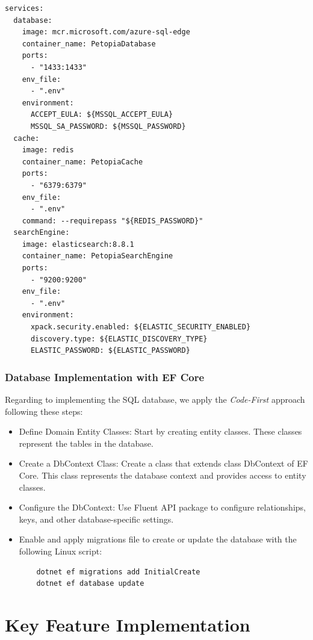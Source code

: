 \begin{lstlisting}[caption=Setup Development Environment with Docker, label={lst:docker-code}]
services:
  database:
    image: mcr.microsoft.com/azure-sql-edge
    container_name: PetopiaDatabase
    ports:
      - "1433:1433"
    env_file:
      - ".env"
    environment:
      ACCEPT_EULA: ${MSSQL_ACCEPT_EULA}
      MSSQL_SA_PASSWORD: ${MSSQL_PASSWORD}
  cache:
    image: redis
    container_name: PetopiaCache
    ports:
      - "6379:6379"
    env_file:
      - ".env"
    command: --requirepass "${REDIS_PASSWORD}"
  searchEngine:
    image: elasticsearch:8.8.1
    container_name: PetopiaSearchEngine
    ports:
      - "9200:9200"
    env_file:
      - ".env"
    environment:
      xpack.security.enabled: ${ELASTIC_SECURITY_ENABLED}
      discovery.type: ${ELASTIC_DISCOVERY_TYPE}
      ELASTIC_PASSWORD: ${ELASTIC_PASSWORD}
\end{lstlisting}

\subsubsection*{Database Implementation with EF Core}

Regarding to implementing the SQL database, we apply the \textit{Code-First} approach following these steps:
\begin{itemize}
    \item Define Domain Entity Classes:
          Start by creating entity classes. These classes represent the tables in the database.

    \item Create a DbContext Class:
          Create a class that extends class DbContext of EF Core. This class represents the database context and provides access to entity classes.

    \item Configure the DbContext:
          Use Fluent API package to configure relationships, keys, and other database-specific settings.

    \item Enable and apply migrations file to create or update the database with the following Linux script:
          \begin{lstlisting}
    dotnet ef migrations add InitialCreate
    dotnet ef database update
  \end{lstlisting}
\end{itemize}

\newpage
\section{Key Feature Implementation}

